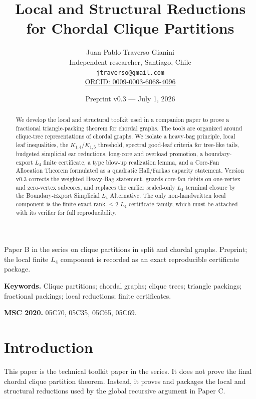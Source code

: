\documentclass[11pt]{article}
\title{Local and Structural Reductions for Chordal Clique Partitions}
\author{Juan Pablo Traverso Gianini\\
Independent researcher, Santiago, Chile\\
\texttt{jtraverso@gmail.com}\\
\href{https://orcid.org/0009-0003-6068-4096}{ORCID: 0009-0003-6068-4096}}
\date{Preprint v0.3 --- July 1, 2026}
\theoremstyle{definition}
\begin{document}
\maketitle

\begin{center}
{\small Paper B in the series on clique partitions in split and chordal graphs. Preprint; the local finite \(L_4\) component is recorded as an exact reproducible certificate package.}
\end{center}

\noindent\textbf{Keywords.}
Clique partitions; chordal graphs; clique trees; triangle packings; fractional packings; local reductions; finite certificates.

\medskip

\noindent\textbf{MSC 2020.}
05C70, 05C35, 05C65, 05C69.

\begin{abstract}
We develop the local and structural toolkit used in a companion paper to prove a fractional triangle-packing theorem for chordal graphs. The tools are organized around clique-tree representations of chordal graphs. We isolate a heavy-bag principle, local leaf inequalities, the \(K_{1,4}/K_{1,5}\) threshold, spectral good-leaf criteria for tree-like tails, budgeted simplicial ear reductions, long-core and overload promotion, a boundary-export \(L_4\) finite certificate, a type blow-up realization lemma, and a Core-Fan Allocation Theorem formulated as a quadratic Hall/Farkas capacity statement. Version v0.3 corrects the weighted Heavy-Bag statement, guards core-fan debits on one-vertex and zero-vertex subcores, and replaces the earlier sealed-only \(L_4\) terminal closure by the Boundary-Export Simplicial \(L_4\) Alternative. The only non-handwritten local component is the finite exact rank-\(\le2\) \(L_4\) certificate family, which must be attached with its verifier for full reproducibility.
\end{abstract}

\tableofcontents

\section{Introduction}

This paper is the technical toolkit paper in the series. It does not prove the final chordal clique partition theorem. Instead, it proves and packages the local and structural reductions used by the global recursive argument in Paper C.
\end{document}
